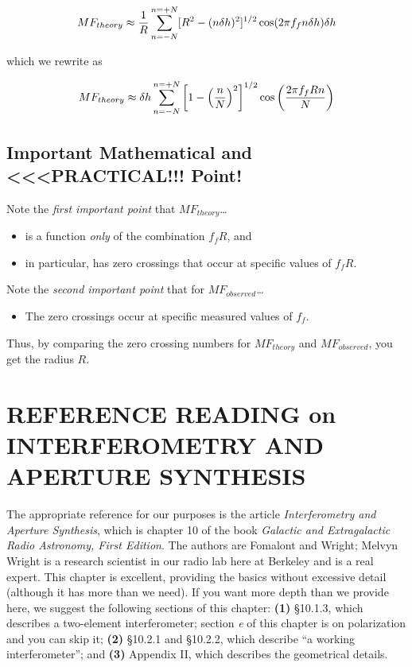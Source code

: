 \documentclass[11pt,preprint]{aastex}
\begin{document}
\begin{equation}
MF_{theory} \approx {1 \over R} \sum_{n=-N}^{n=+N}
[R^2 - (n \delta h)^2]^{1/2} \cos(2 \pi f_f n\delta h) \delta h
\end{equation}

\noindent which we rewrite as

\begin{equation}
MF_{theory} \approx  \delta h \sum_{n=-N}^{n=+N}
\left[ 1 - \left( n \over N\right)^2 \right]^{1/2} 
\cos \left( 2 \pi f_f R n \over N \right)
\end{equation}

\subsection{Important Mathematical and <<<PRACTICAL!!! Point!}

Note the {\it first important point} that $MF_{theory}$\dots \begin{itemize}
\item is a function {\it only} of the combination $f_f R$, and
\item in particular, has zero crossings that occur at specific
  values of $f_f R$.
  \end{itemize}

  Note the {\it second important point} that for $MF_{observed}$\dots
  \begin{itemize}
    \item The zero crossings occur at specific measured values of
      $f_{f}$. \end{itemize} 

\noindent Thus, by comparing the zero crossing numbers for $MF_{theory}$ and
$MF_{observed}$, you get the radius $R$. 


\section {REFERENCE READING on INTERFEROMETRY AND APERTURE SYNTHESIS}

	The appropriate reference for our purposes is the article {\it
Interferometry and Aperture Synthesis}, which is chapter 10 of the book
{\it Galactic and Extragalactic Radio Astronomy, First Edition}.  The
authors are Fomalont and Wright; Melvyn Wright is a research scientist
in our radio lab here at Berkeley and is a real expert.  This chapter is
excellent, providing the basics without excessive detail (although it
has more than we need).  If you want more depth than we provide here, we
suggest the following sections of this chapter: {\bf (1)} \S10.1.3,
which describes a two-element interferometer; section {\it e} of this
chapter is on polarization and you can skip it; {\bf (2)} \S10.2.1 and
\S10.2.2, which describe ``a working interferometer''; and {\bf (3)}
Appendix II, which describes the geometrical details. 
\end{document}
